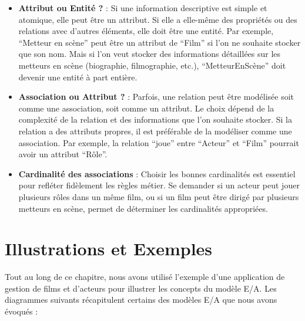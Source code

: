 \documentclass{article}
\begin{document}
\begin{itemize}
    \item \textbf{Attribut ou Entité ?} : Si une information descriptive est simple et atomique, elle peut être un attribut. Si elle a elle-même des propriétés ou des relations avec d'autres éléments, elle doit être une entité. Par exemple, ``Metteur en scène'' peut être un attribut de ``Film'' si l'on ne souhaite stocker que son nom. Mais si l'on veut stocker des informations détaillées sur les metteurs en scène (biographie, filmographie, etc.), ``MetteurEnScène'' doit devenir une entité à part entière.
    \item \textbf{Association ou Attribut ?} :  Parfois, une relation peut être modélisée soit comme une association, soit comme un attribut.  Le choix dépend de la complexité de la relation et des informations que l'on souhaite stocker.  Si la relation a des attributs propres, il est préférable de la modéliser comme une association.  Par exemple, la relation ``joue'' entre ``Acteur'' et ``Film'' pourrait avoir un attribut ``Rôle''.
    \item \textbf{Cardinalité des associations} :  Choisir les bonnes cardinalités est essentiel pour refléter fidèlement les règles métier.  Se demander si un acteur peut jouer plusieurs rôles dans un même film, ou si un film peut être dirigé par plusieurs metteurs en scène, permet de déterminer les cardinalités appropriées.
\end{itemize}

\section{Illustrations et Exemples}

Tout au long de ce chapitre, nous avons utilisé l'exemple d'une application de gestion de films et d'acteurs pour illustrer les concepts du modèle E/A.  Les diagrammes suivants récapitulent certains des modèles E/A que nous avons évoqués :
\end{document}
